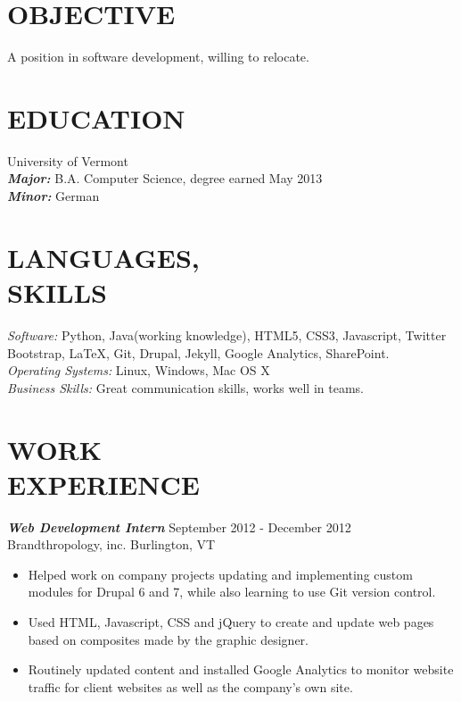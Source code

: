 \documentclass[line,margin]{res}
\begin{document}
\address{Permanent Address: P.O. Box 154 Gaysville, VT 05746}
\address{Email: perkinsean@gmail.com Cell Phone: (802) 222-7749} 


 
\begin{resume}
 
\section{OBJECTIVE}       A position in software development, willing to relocate.
 
 
\section{EDUCATION} {University of Vermont} \\
                {\sl {\bfseries Major:}}  B.A. Computer Science, degree earned May 2013 \\
                {\sl {\bfseries Minor:}} German  
                 
                
\section{LANGUAGES, \\ SKILLS} {\sl Software:} Python, Java(working knowledge), HTML5, CSS3, Javascript, Twitter Bootstrap, \LaTeX, Git, Drupal, Jekyll, Google Analytics, SharePoint.  \\           
 {\sl Operating Systems:} Linux, Windows, Mac OS X \\
 {\sl Business Skills:} Great communication skills, works well in teams.\\
 
\section{WORK \\ EXPERIENCE} {\sl {\bfseries Web Development Intern}}  \hfill September 2012 - December 2012 \\
                Brandthropology, inc.  Burlington, VT
                 \begin{itemize}  \itemsep -2pt %
                 \item Helped work on company projects updating and implementing custom modules for Drupal 6 and 7, while also learning to use Git version control.
                \item Used HTML, Javascript, CSS and jQuery to create and update web pages based on composites made by the graphic designer.
	     \item Routinely updated content and installed Google Analytics to monitor website traffic for client websites as well as the company's own site.
                \end{itemize}
 

\end{resume}
\end{document}

